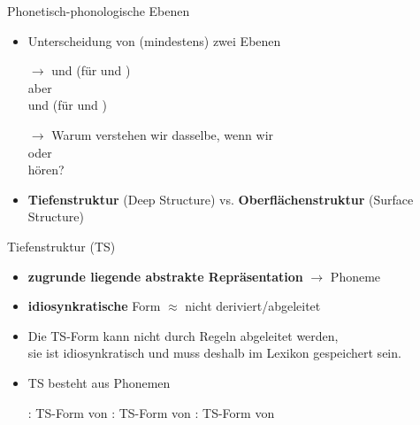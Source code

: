 \begin{frame}{Phonetisch-phonologische Ebenen}

	\begin{itemize}
		\item Unterscheidung von (mindestens) zwei Ebenen
		\item[$\rightarrow$]  und  (für  und )\\
		aber\\
		 und  (für  und )
		\item[]
		\item[$\rightarrow$] Warum verstehen wir dasselbe, wenn wir\\
		\textipa{[ha:k@\alertred{n}]} oder \textipa{[ha:k\alertred{N}]}\\
		hören?
		\item[]
		\item \textbf{Tiefenstruktur} (Deep Structure) vs. \textbf{Oberflächenstruktur} (Surface Structure)
	\end{itemize}
	
\end{frame}




\begin{frame}{Tiefenstruktur (TS)}
	
\begin{itemize}
	\item \textbf{zugrunde liegende abstrakte Repräsentation} $\rightarrow$ Phoneme \textipa{/ /}
	\item[]
	\item \textbf{idiosynkratische} Form $\approx$ nicht deriviert/abgeleitet
	\item Die TS-Form kann nicht durch Regeln abgeleitet werden,\\
                sie ist idiosynkratisch und muss deshalb im Lexikon gespeichert sein.
	\item[]
	\item TS besteht aus Phonemen
	
	\eal
		\ex {}: TS-Form von 
		\ex {}: TS-Form von 
		\ex {}: TS-Form von 
	\zl
	
\end{itemize}
		
\end{frame}


